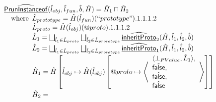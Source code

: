 \documentclass{article}
\newcommand{\ifc}[1]{{\rm if}\begin{array}[t]{l}#1\end{array}}
\newcommand{\SF}[1]{\mbox{\textsf{#1}}}
\newcommand{\wherec}[1]{{\rm where}\begin{array}[t]{l}#1\end{array}}
\newcommand{\owc}{{\rm otherwise}}
\newcommand{\ahf}[1]{\widehat{\underline{\sf #1}}}
\newcommand{\afalse}{\hat{\SF{false}}}
\begin{document}
\[\begin{array}{ll}
& \ahf {PrunInstanceof} (\hat{l}_{obj}, \hat{l}_{fun}, \hat{b}, \hat{H}) = \hat{H}_1 \sqcap \hat{H}_2\\
& \quad\wherec{
  \hat{L}_{prototype} = \hat{H}(\hat{l}_{fun})(``prototype").1.1.1.2\\
  \hat{L}_{proto} = \hat{H}(\hat{l}_{obj})(@proto).1.1.1.2\\
  \hat{L}_1 = 
      \bigsqcup_{\hat{l}_1 \in \hat{L}_{proto}} \bigsqcup_{\hat{l}_2 \in \hat{L}_{prototype}} \ahf{inheritProto}_2(\hat{H}, \hat{l}_1, \hat{l}_2, \hat{b})\\
  \hat{L}_2 = 
      \bigsqcup_{\hat{l}_1 \in \hat{L}_{proto}} \bigsqcup_{\hat{l}_2 \in \hat{L}_{prototype}} \ahf{inheritProto}_1(\hat{H}, \hat{l}_1, \hat{l}_2, \hat{b})\\
  \hat{H}_1 = 
      \hat{H} \left[ \hat{l}_{obj} \mapsto \hat{H}(\hat{l}_{obj}) \left[ @proto \mapsto 
        \left\langle 
        \begin{array}{l}
        \langle \bot_{PValue}, \hat{L}_1 \rangle,\\
        \afalse,\\
        \afalse,\\
        \afalse\\
        \end{array}
        \right\rangle      
      \right]\right]\\
  \hat{H}_2 = 
}
\end{array}\]
\end{document}
